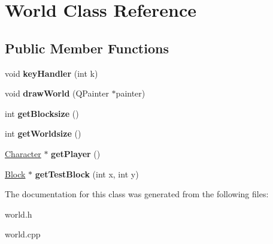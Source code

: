 \hypertarget{class_world}{\section{World Class Reference}
\label{class_world}
}
\subsection*{Public Member Functions}
\begin{DoxyCompactItemize}
\item 
\hypertarget{class_world_a83f49e35b8f8b33f14198e87b2fa7312}{void {\bfseries key\-Handler} (int k)}\label{class_world_a83f49e35b8f8b33f14198e87b2fa7312}

\item 
\hypertarget{class_world_a08d405bfe0cef56b06f731addeb22bcf}{void {\bfseries draw\-World} (Q\-Painter $\ast$painter)}\label{class_world_a08d405bfe0cef56b06f731addeb22bcf}

\item 
\hypertarget{class_world_ab44648ec788ea8dfe063a1fce7f86026}{int {\bfseries get\-Blocksize} ()}\label{class_world_ab44648ec788ea8dfe063a1fce7f86026}

\item 
\hypertarget{class_world_a43fe0009fa77b79202cd3ef7e8e7af5f}{int {\bfseries get\-Worldsize} ()}\label{class_world_a43fe0009fa77b79202cd3ef7e8e7af5f}

\item 
\hypertarget{class_world_a66856566fadcf64eba71f5e3ccc790df}{\hyperlink{class_character}{Character} $\ast$ {\bfseries get\-Player} ()}\label{class_world_a66856566fadcf64eba71f5e3ccc790df}

\item 
\hypertarget{class_world_a24f0eab80a2a3b6bc983f58fa2adaa55}{\hyperlink{class_block}{Block} $\ast$ {\bfseries get\-Test\-Block} (int x, int y)}\label{class_world_a24f0eab80a2a3b6bc983f58fa2adaa55}

\end{DoxyCompactItemize}


The documentation for this class was generated from the following files\-:\begin{DoxyCompactItemize}
\item 
world.\-h\item 
world.\-cpp\end{DoxyCompactItemize}
